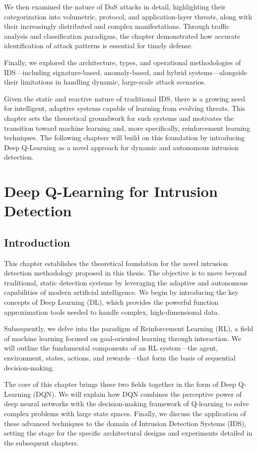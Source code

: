 \documentclass[12pt]{report}
\begin{document}
We then examined the nature of DoS attacks in detail, highlighting their categorization into volumetric, protocol, and application-layer threats, along with their increasingly distributed and complex manifestations. Through traffic analysis and classification paradigms, the chapter demonstrated how accurate identification of attack patterns is essential for timely defense.

Finally, we explored the architecture, types, and operational methodologies of IDS—including signature-based, anomaly-based, and hybrid systems—alongside their limitations in handling dynamic, large-scale attack scenarios.

Given the static and reactive nature of traditional IDS, there is a growing need for intelligent, adaptive systems capable of learning from evolving threats. This chapter sets the theoretical groundwork for such systems and motivates the transition toward machine learning and, more specifically, reinforcement learning techniques. The following chapters will build on this foundation by introducing Deep Q-Learning as a novel approach for dynamic and autonomous intrusion detection.


\chapter{Deep Q-Learning for Intrusion Detection}
\label{chap:dqn-for-ids}

\section{Introduction}
This chapter establishes the theoretical foundation for the novel intrusion detection methodology proposed in this thesis. The objective is to move beyond traditional, static detection systems by leveraging the adaptive and autonomous capabilities of modern artificial intelligence. We begin by introducing the key concepts of Deep Learning (DL), which provides the powerful function approximation tools needed to handle complex, high-dimensional data.

Subsequently, we delve into the paradigm of Reinforcement Learning (RL), a field of machine learning focused on goal-oriented learning through interaction. We will outline the fundamental components of an RL system—the agent, environment, states, actions, and rewards—that form the basis of sequential decision-making.

The core of this chapter brings these two fields together in the form of Deep Q-Learning (DQN). We will explain how DQN combines the perceptive power of deep neural networks with the decision-making framework of Q-learning to solve complex problems with large state spaces. Finally, we discuss the application of these advanced techniques to the domain of Intrusion Detection Systems (IDS), setting the stage for the specific architectural designs and experiments detailed in the subsequent chapters.
\end{document}

